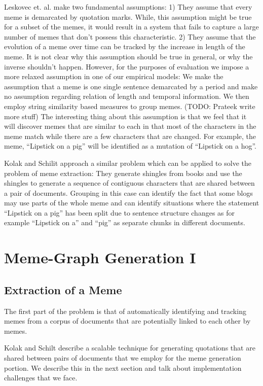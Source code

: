 \documentclass{acm_proc_article-sp}
\begin{document}
Leskovec et. al.\cite{leskovec2009meme} make two fundamental assumptions: 1) They assume that every meme is demarcated by quotation marks. While, this assumption might be true for a subset of the memes, it would result in a system that fails to capture a large number of memes that don't possess this characteristic. 2) They assume that the evolution of a meme over time can be tracked by the increase in length of the meme. It is not clear why this assumption should be true in general, or why the inverse shouldn't happen. However, for the purposes of evaluation we impose a more relaxed assumption in one of our empirical models: We make the assumption that a meme is one single sentence demarcated by a period and make no assumption regarding relation of length and temporal information. We then employ string similarity based measures to group memes. (TODO: Prateek write more stuff) The interesting thing about this assumption is that we feel that it will discover memes that are similar to each in that most of the characters in the meme match while there are a few characters that are changed. For example, the meme, ``Lipstick on a pig'' will be identified as a mutation of ``Lipstick on a hog''. 


Kolak and Schilit \cite{kolak2008generating} approach a similar problem which can be applied to solve the problem of meme extraction: They generate shingles from books and use the shingles to generate a sequence of contiguous characters that are shared between a pair of documents. Grouping in this case can identify the fact that some blogs may use parts of the whole meme and can identify situations where the statement ``Lipstick on a pig'' has been split due to sentence structure changes as for example ``Lipstick on a'' and ``pig'' as separate chunks in different documents. 

\section{Meme-Graph Generation I}
\subsection{Extraction of a Meme}
The first part of the problem is that of automatically identifying and tracking memes from a corpus of documents that are potentially linked to each other by memes. 

Kolak and Schilt \cite{kolak2008generating} describe a scalable technique for generating quotations that are shared between pairs of documents that we employ for the meme generation portion. We describe this in the next section and talk about implementation challenges that we face.
\end{document}
